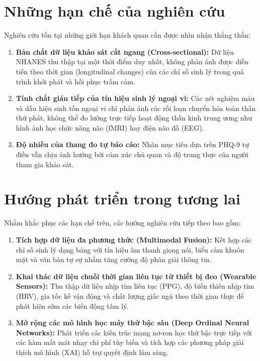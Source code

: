 \section{Những hạn chế của nghiên cứu}
\label{sec:han-che-nghien-cuu}

Nghiên cứu tồn tại những giới hạn khách quan cần được nhìn nhận thẳng thắn:
\begin{enumerate}
    \item \textbf{Bản chất dữ liệu khảo sát cắt ngang (Cross-sectional):} Dữ liệu NHANES thu thập tại một thời điểm duy nhất, không phản ánh được diễn tiến theo thời gian (longitudinal changes) của các chỉ số sinh lý trong quá trình khởi phát và hồi phục trầm cảm.
    \item \textbf{Tính chất gián tiếp của tín hiệu sinh lý ngoại vi:} Các xét nghiệm máu và dấu hiệu sinh tồn ngoại vi chỉ phản ánh các rối loạn chuyển hóa toàn thân thứ phát, không thể đo lường trực tiếp hoạt động thần kinh trung ương như hình ảnh học chức năng não (fMRI) hay điện não đồ (EEG).
    \item \textbf{Độ nhiễu của thang đo tự báo cáo:} Nhãn mục tiêu dựa trên PHQ-9 tự điền vẫn chịu ảnh hưởng bởi cảm xúc chủ quan và độ trung thực của người tham gia khảo sát.
\end{enumerate}

\section{Hướng phát triển trong tương lai}
\label{sec:huong-phat-trien}

Nhằm khắc phục các hạn chế trên, các hướng nghiên cứu tiếp theo bao gồm:
\begin{enumerate}
    \item \textbf{Tích hợp dữ liệu đa phương thức (Multimodal Fusion):} Kết hợp các chỉ số sinh lý dạng bảng với tín hiệu âm thanh giọng nói, biểu cảm khuôn mặt và văn bản tự sự nhằm tăng cường độ phân giải thông tin.
    \item \textbf{Khai thác dữ liệu chuỗi thời gian liên tục từ thiết bị đeo (Wearable Sensors):} Thu thập dữ liệu nhịp tim liên tục (PPG), độ biến thiên nhịp tim (HRV), gia tốc kế vận động và chất lượng giấc ngủ theo thời gian thực để phát hiện sớm các biến động tâm lý.
    \item \textbf{Mở rộng các mô hình học máy thứ bậc sâu (Deep Ordinal Neural Networks):} Phát triển các kiến trúc mạng nơ-ron học thứ bậc trực tiếp với các hàm mất mát nhạy chi phí tùy biến và tích hợp các phương pháp giải thích mô hình (XAI) hỗ trợ quyết định lâm sàng.
\end{enumerate}

